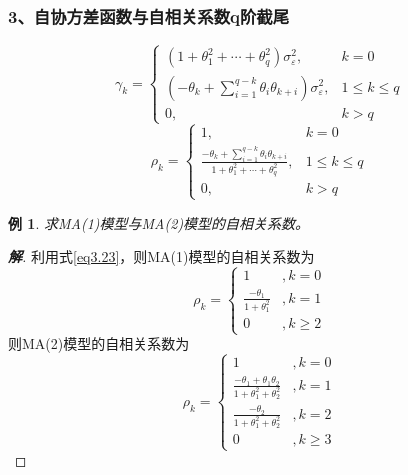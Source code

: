 \documentclass[12pt, a4paper, oneside]{ctexbook}
\newtheorem{example}[theorem]{例}
\newcommand\jie[2]{\begin{proof}[\textbf{#1}]
    #2
\end{proof}}
\begin{document}
\subsubsection{3、自协方差函数与自相关系数q阶截尾}
\begin{equation}
    \gamma_k=
    \begin{cases}
        (1+\theta_1^2+\cdots+\theta_q^2)\sigma_\varepsilon^2,                 & k=0            \\
        (-\theta_k+\sum_{i=1}^{q-k}\theta_i\theta_{k+i})\sigma_\varepsilon^2, & 1\leq  k\leq q \\
        0,                                                                    & k>q
    \end{cases}
\end{equation}
\begin{equation}\label{eq3.23}
    \rho_k=\begin{cases}
        1,                                                                                     & k=0            \\
        \frac{-\theta_k+\sum_{i=1}^{q-k}\theta_i\theta_{k+i}}{1+\theta_1^2+\cdots+\theta_q^2}, & 1\leq  k\leq q \\
        0,                                                                                     & k>q
    \end{cases}
\end{equation}

\begin{example}
    求MA(1)模型与MA(2)模型的自相关系数。
\end{example}
\jie{解}{
    利用式\ref{eq3.23}，则MA(1)模型的自相关系数为
    \begin{equation}
        \rho_k=\begin{cases}
            1                              & ,k=0    \\
            \frac{-\theta_1}{1+\theta_1^2} & ,k=1    \\
            0                              & ,k\geq2
        \end{cases}
    \end{equation}
    则MA(2)模型的自相关系数为
    \begin{equation}
        \rho_k=\begin{cases}
            1                                                          & ,k=0    \\
            \frac{-\theta_1+\theta_1\theta_2}{1+\theta_1^2+\theta_2^2} & ,k=1    \\
            \frac{-\theta_2}{1+\theta_1^2+\theta_2^2}                  & ,k=2    \\
            0                                                          & ,k\geq3
        \end{cases}
    \end{equation}
}
\end{document}
